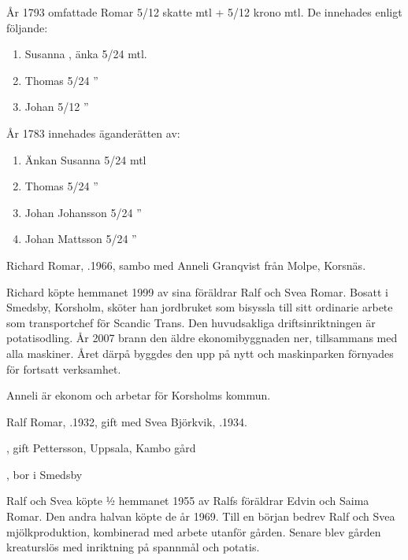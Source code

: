 År 1793 omfattade Romar 5/12 skatte mtl + 5/12 krono mtl. De innehades enligt följande:
\begin{enumerate}
  \item Susanna , änka 5/24 mtl.
  \item Thomas         5/24  ”
  \item Johan          5/12  ”
\end{enumerate}

År 1783 innehades äganderätten av:
\begin{enumerate}
  \item Änkan Susanna    5/24  mtl
  \item Thomas           5/24   ”
  \item Johan Johansson  5/24   ”
  \item Johan Mattsson   5/24   ”
\end{enumerate}





Richard Romar, .1966, sambo med Anneli Granqvist från Molpe, Korsnäs.
\begin{jhchildren}
  \item {}
  \item {}
  \item {}
\end{jhchildren}
Richard köpte hemmanet 1999 av sina föräldrar Ralf och Svea Romar. Bosatt i Smedsby, Korsholm, sköter han jordbruket som bisyssla till sitt ordinarie arbete som transportchef för Scandic Trans. Den huvudsakliga driftsinriktningen är potatisodling. År 2007 brann den äldre ekonomibyggnaden ner, tillsammans med alla maskiner. Året därpå byggdes den upp på nytt och maskinparken förnyades för fortsatt verksamhet.

Anneli är ekonom och arbetar för Korsholms kommun.



Ralf Romar, .1932, gift med Svea Björkvik, .1934.
\begin{jhchildren}
  \item {}, gift Pettersson, Uppsala, Kambo gård
  \item {}, bor i Smedsby
\end{jhchildren}
Ralf och Svea köpte ½ hemmanet 1955 av Ralfs föräldrar Edvin och Saima Romar. Den andra halvan köpte de  år 1969. Till en början bedrev Ralf och Svea mjölkproduktion, kombinerad med arbete utanför gården. Senare blev gården kreaturslös med inriktning på spannmål och potatis.


